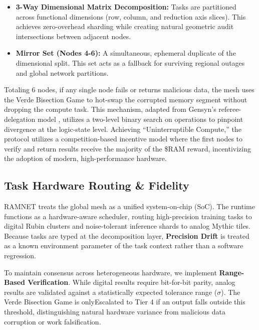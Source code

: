 \documentclass[conference]{IEEEtran}
\begin{document}
\begin{itemize}
    \item \textbf{3-Way Dimensional Matrix Decomposition:} Tasks are partitioned across functional dimensions (row, column, and reduction axis slices). This achieves zero-overhead sharding while creating natural geometric audit intersections between adjacent nodes.
    \item \textbf{Mirror Set (Nodes 4-6):} A simultaneous, ephemeral duplicate of the dimensional split. This set acts as a fallback for surviving regional outages and global network partitions.
\end{itemize}
Totaling 6 nodes, if any single node fails or returns malicious data, the mesh uses the Verde Bisection Game to hot-swap the corrupted memory segment without dropping the compute task. This mechanism, adapted from Gensyn's referee-delegation model \cite{gensyn2025verde}, utilizes a two-level binary search on operations to pinpoint divergence at the logic-state level. Achieving ``Uninterruptible Compute,'' the protocol utilizes a competition-based incentive model where the first nodes to verify and return results receive the majority of the \$RAM reward, incentivizing the adoption of modern, high-performance hardware.

\subsection{Task Hardware Routing \& Fidelity}
RAMNET treats the global mesh as a unified system-on-chip (SoC). The runtime functions as a hardware-aware scheduler, routing high-precision training tasks to digital Rubin clusters and noise-tolerant inference shards to analog Mythic tiles. Because tasks are typed at the decomposition layer, \textbf{Precision Drift} is treated as a known environment parameter of the task context rather than a software regression. 

To maintain consensus across heterogeneous hardware, we implement \textbf{Range-Based Verification}. While digital results require bit-for-bit parity, analog results are validated against a statistically expected tolerance range ($\sigma$). The Verde Bisection Game is onlyEscalated to Tier 4 if an output falls outside this threshold, distinguishing natural hardware variance from malicious data corruption or work falsification.
\end{document}
